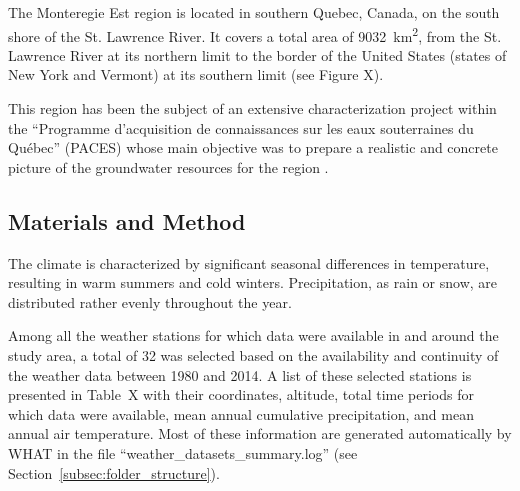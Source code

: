 \documentclass[ARTICLETHERMIC.tex]{subfiles}
\begin{document}
The Monteregie Est region is located in southern Quebec, Canada, on the south shore of the St. Lawrence River. It covers a total area of 9032~km\textsuperscript{2}, from the St. Lawrence River at its northern limit to the border of the United States (states of New York and Vermont) at its southern limit (see Figure X).

This region has been the subject of an extensive characterization project within the ``Programme d'acquisition de connaissances sur les eaux souterraines du Québec'' (PACES) whose main objective was to prepare a realistic and concrete picture of the groundwater resources for the region \citep{carrier_portrait_2013}.

\subsection{Materials and Method}


The climate is characterized by significant seasonal differences in temperature, resulting in warm summers and cold winters. Precipitation, as rain or snow, are distributed rather evenly throughout the year.

Among all the weather stations for which data were available in and around the study area, a total of 32 was selected based on the availability and continuity of the weather data between 1980 and 2014. A list of these selected stations is presented in Table~X with their coordinates, altitude, total time periods for which data were available, mean annual cumulative precipitation, and mean annual air temperature. Most of these information are generated automatically by WHAT in the file ``weather\_datasets\_summary.log'' (see Section~\ref{subsec:folder_structure}).
\end{document}
